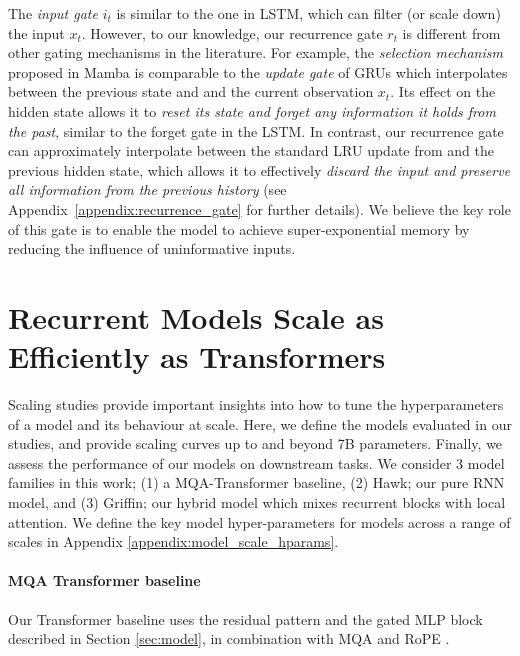 \documentclass[11pt, a4paper, logo, onecolumn]{googledeepmind}
\theoremstyle{definition}
\begin{document}
The \emph{input gate} $i_t$ is similar to the one in LSTM, which can filter (or scale down) the input $x_t$.
However, to our knowledge, our recurrence gate $r_t$ is different from other gating mechanisms in the literature.
For example, the \emph{selection mechanism} proposed in Mamba  \citep{gu2023mamba} is comparable to the \emph{update gate} of GRUs which interpolates between the previous state and and the current observation $x_t$.
Its effect on the hidden state allows it to \emph{reset its state and forget any information it holds from the past}, similar to the forget gate in the LSTM. 
In contrast, our recurrence gate can approximately interpolate between the standard LRU update from \citet{orvieto2023universality} and the previous hidden state, which allows it to effectively \emph{discard the input and preserve all information from the previous history} (see Appendix~\ref{appendix:recurrence_gate} for further details). We believe the key role of this gate is to enable the model to achieve super-exponential memory by reducing the influence of uninformative inputs.





\section{Recurrent Models Scale as Efficiently as Transformers}
\label{sec:scaling_new}
Scaling studies provide important insights into how to tune the hyperparameters of a model and its behaviour at scale. 
Here, we define the models evaluated in our studies, and provide scaling curves up to and beyond 7B parameters. Finally, we assess the performance of our models on downstream tasks.
We consider 3 model families in this work; (1) a MQA-Transformer baseline, (2) Hawk; our pure RNN model, and (3) Griffin; our hybrid model which mixes recurrent blocks with local attention.  We define the key model hyper-parameters for models across a range of scales in Appendix \ref{appendix:model_scale_hparams}. %


\paragraph{MQA Transformer baseline}
\label{sec:MQA-Transformer-baseline}

Our Transformer baseline uses the residual pattern and the gated MLP block described in Section \ref{sec:model}, in combination with MQA \citep{shazeer2019fast} and RoPE \citep{su2021roformer}.
\end{document}
